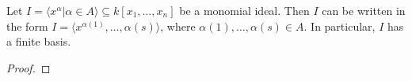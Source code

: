 \begin{theorem}
    \label{thm:Dickson_MvPolynomial}
    \leanok 
    Let $I = \langle x^{\alpha} | \alpha \in A \rangle \subseteq k[x_1, \ldots, x_n]$ be a monomial ideal.
    Then $I$ can be written in the form $I = \langle x^{\alpha(1)}, \ldots , {\alpha(s)} \rangle$, where
    $\alpha(1), \ldots, \alpha(s) \in A$.
    In particular, $I$ has a finite basis.
\end{theorem}
\begin{proof}
  \leanok 
\end{proof}